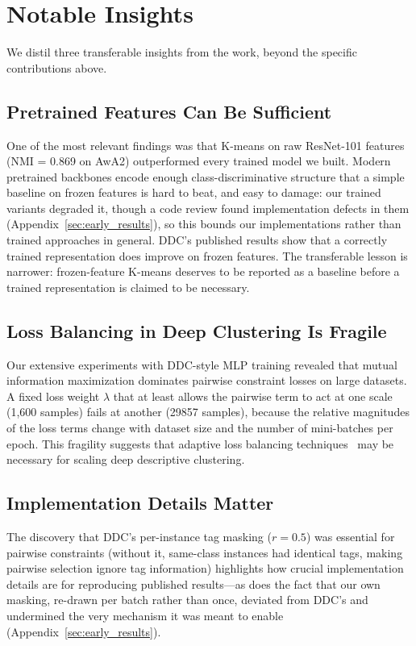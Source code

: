 \section{Notable Insights}

We distil three transferable insights from the work, beyond the specific contributions above.

\subsection{Pretrained Features Can Be Sufficient}

One of the most relevant findings was that K-means on raw ResNet-101 features (NMI = 0.869 on AwA2) outperformed every trained model we built. Modern pretrained backbones encode enough class-discriminative structure that a simple baseline on frozen features is hard to beat, and easy to damage: our trained variants degraded it, though a code review found implementation defects in them (Appendix~\ref{sec:early_results}), so this bounds our implementations rather than trained approaches in general. DDC's published results show that a correctly trained representation does improve on frozen features. The transferable lesson is narrower: frozen-feature K-means deserves to be reported as a baseline before a trained representation is claimed to be necessary.

\subsection{Loss Balancing in Deep Clustering Is Fragile}

Our extensive experiments with DDC-style MLP training revealed that mutual information maximization dominates pairwise constraint losses on large datasets. A fixed loss weight $\lambda$ that at least allows the pairwise term to act at one scale (1,600 samples) fails at another (29857 samples), because the relative magnitudes of the loss terms change with dataset size and the number of mini-batches per epoch. This fragility suggests that adaptive loss balancing techniques~\citep{Crawshaw2020} may be necessary for scaling deep descriptive clustering.

\subsection{Implementation Details Matter}

The discovery that DDC's per-instance tag masking ($r = 0.5$) was essential for pairwise constraints (without it, same-class instances had identical tags, making pairwise selection ignore tag information) highlights how crucial implementation details are for reproducing published results---as does the fact that our own masking, re-drawn per batch rather than once, deviated from DDC's and undermined the very mechanism it was meant to enable (Appendix~\ref{sec:early_results}).

